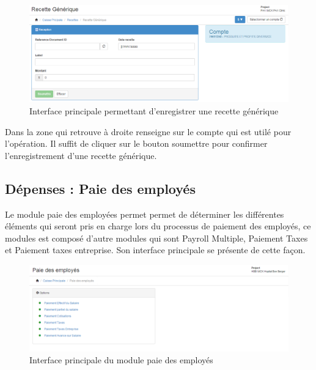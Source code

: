 \documentclass[12pt,a4paper]{report}
\begin{document}
\begin{figure}[h]
\begin{center}
\includegraphics[width=14cm]{pic/recetteGen2.png}
\end{center}
\caption{Interface principale permettant d'enregistrer une recette générique}
\label{Interface principale permettant d'enregistrer une recette générique}
\end{figure}

Dans la zone qui retrouve à droite renseigne sur le compte qui est utilé pour l'opération. Il suffit de cliquer sur le bouton soumettre pour confirmer l'enregistrement d'une recette générique.

\subsection{Dépenses : Paie des employés}
Le module paie des employées permet permet de déterminer les différentes éléments qui seront pris en charge lors du processus de paiement des employés, ce modules est composé d'autre modules qui sont Payroll Multiple, Paiement Taxes et Paiement taxes entreprise. Son interface principale se présente de cette façon.


\begin{figure}[h]
\begin{center}
\includegraphics[width=14cm]{pic/paieEmp.png}
\end{center}
\caption{Interface principale du module paie des employés}
\label{Interface principale du module paie des employés}
\end{figure}
\end{document}
